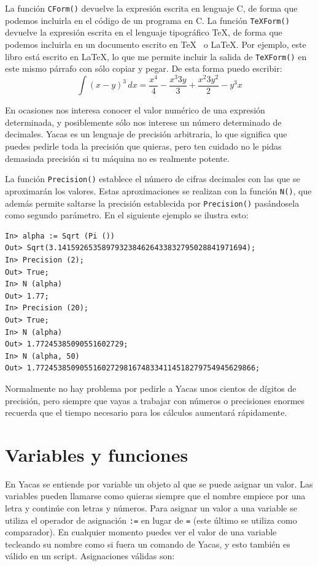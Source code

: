 La función \verb+CForm()+ devuelve la expresión escrita en lenguaje C,
de forma que  podemos incluirla en el  código de un programa  en C. La
función \verb+TeXForm()+ devuelve la  expresión escrita en el lenguaje
tipográfico  \TeX, de  forma  que podemos  incluirla  en un  documento
escrito en  \TeX~ o \LaTeX.  Por ejemplo,  este libro está  escrito en
\LaTeX, lo  que me  permite incluir la  salida de  \verb+TeXForm()+ en
este  mismo párrafo  con  sólo copiar  y pegar.  De  esta forma  puedo
escribir: $$\int  (x-y)^3 \, dx  = \frac{x  ^{4}}{4} - \frac{x  ^{3} 3
y}{3} + \frac{x ^{2} 3 y ^{2}}{2} - y ^{3} x$$

En ocasiones nos  interesa conocer el valor numérico  de una expresión
determinada, y posiblemente sólo nos interese un número determinado de
decimales.  Yacas  es un  lenguaje  de  precisión arbitraria,  lo  que
significa que puedes  pedirle toda la precisión que  quieras, pero ten
cuidado no le pidas demasiada precisión  si tu máquina no es realmente
potente.

La función \verb+Precision()+ establece  el número de cifras decimales
con  las  que se  aproximarán  los  valores. Estas  aproximaciones  se
realizan con  la función  \verb+N()+, que  además permite  saltarse la
precisión establecida por \verb+Precision()+ pasándosela como segundo
parámetro. En el siguiente ejemplo se ilustra esto:


\begin{verbatim}
In> alpha := Sqrt (Pi ())
Out> Sqrt(3.1415926535897932384626433832795028841971694);
In> Precision (2);
Out> True;
In> N (alpha)
Out> 1.77;
In> Precision (20);
Out> True;
In> N (alpha)
Out> 1.77245385090551602729;
In> N (alpha, 50)
Out> 1.77245385090551602729816748334114518279754945629866;
\end{verbatim}

Normalmente  no hay  problema  por  pedirle a  Yacas  unos cientos  de
dígitos de precisión, pero siempre que  vayas a trabajar con números o
precisiones enormes recuerda que el tiempo necesario para los cálculos
aumentará rápidamente.



\section{Variables y funciones}


En Yacas se entiende por variable un objeto al que se puede asignar un
valor.  Las variables  pueden  llamarse como  quieras  siempre que  el
nombre  empiece  por  una  letra  y continúe  con  letras  y  números.
Para  asignar un  valor  a  una variable  se  utiliza  el operador  de
asignación \verb+:=+ en lugar de \verb+=+ (este último se utiliza como
comparador). En cualquier momento puedes  ver el valor de una variable
tecleando su nombre como si fuera  un comando de Yacas, y esto también
es válido en un script. Asignaciones válidas son:

